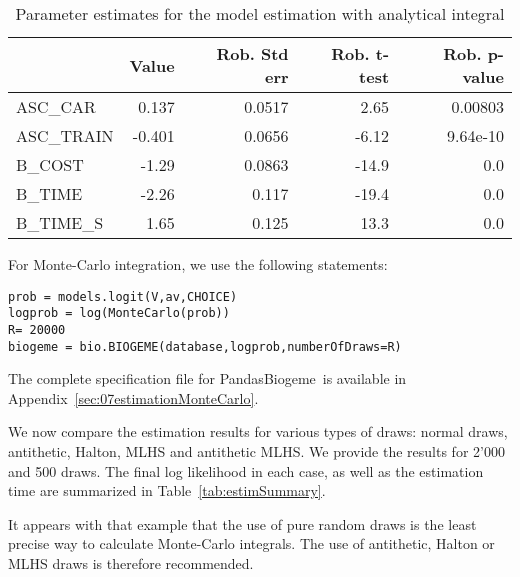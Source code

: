 \documentclass[12pt,a4paper]{article}
\newcommand{\PBIOGEME}{PandasBiogeme}
\begin{document}
\begin{table}
  \begin{center}
\begin{tabular}{lrrrr}
{} &  Value &  Rob. Std err &  Rob. t-test &  Rob. p-value \\
\hline
ASC\_CAR   &  0.137 &        0.0517 &         2.65 &       0.00803 \\
ASC\_TRAIN & -0.401 &        0.0656 &        -6.12 &      9.64e-10 \\
B\_COST    &  -1.29 &        0.0863 &        -14.9 &           0.0 \\
B\_TIME    &  -2.26 &         0.117 &        -19.4 &           0.0 \\
B\_TIME\_S  &   1.65 &         0.125 &         13.3 &           0.0 \\
\end{tabular}
  \end{center}
  \caption{\label{sec:parametersIntegral}Parameter estimates for the
    model estimation with analytical integral}
\end{table}


For Monte-Carlo integration, we use the following statements:
\begin{lstlisting}
prob = models.logit(V,av,CHOICE)
logprob = log(MonteCarlo(prob))
R= 20000
biogeme = bio.BIOGEME(database,logprob,numberOfDraws=R)
\end{lstlisting}

The complete specification file for \PBIOGEME\ is available in
Appendix~\ref{sec:07estimationMonteCarlo}.

We now compare the estimation results for various types of draws: normal draws, antithetic,
Halton, MLHS and antithetic MLHS. We provide the results for 2'000 and 500 draws.
The final log likelihood in each case, as well as the estimation time
are summarized in Table~\ref{tab:estimSummary}.

It appears with that example that the use of pure random draws is the least precise way
to calculate Monte-Carlo integrals. The use of antithetic, Halton or
MLHS draws is therefore recommended.
\end{document}
